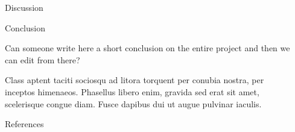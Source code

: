 \documentclass[final]{beamer}
\newlength{\sepwidth}
\newlength{\colwidth}
\newcommand{\separatorcolumn}{\begin{column}{\sepwidth}\end{column}}
\begin{document}
\begin{frame}[t]
\begin{columns}[t]
\begin{column}{\colwidth}
\begin{block}{Discussion}
        \end{block}

        \begin{block}{Conclusion}
        
          Can someone write here a short conclusion on the entire project and then we can edit from there? \par
          Class aptent taciti sociosqu ad litora torquent per conubia nostra, per
          inceptos himenaeos. Phasellus libero enim, gravida sed erat sit amet,
          scelerisque congue diam. Fusce dapibus dui ut augue pulvinar iaculis.

        \end{block}

        \begin{block}{References}

          \nocite{*}
          \footnotesize{}

        \end{block}  
      \end{column}

      \separatorcolumn
    \end{columns}
  \end{frame}
\end{document}
